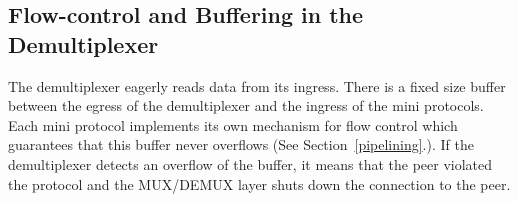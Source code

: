 \subsection{Flow-control and Buffering in the Demultiplexer}
\label{mux-flow-control}
The demultiplexer eagerly reads data from its ingress.
There is a fixed size buffer between the egress of the demultiplexer and the ingress of
the mini protocols.
Each mini protocol implements its own mechanism for flow control which guarantees that this buffer
never overflows (See Section~\ref{pipelining}.).
If the demultiplexer detects an overflow of the buffer, it means that the peer violated the
protocol and the MUX/DEMUX layer shuts down the connection to the peer.


%
%

